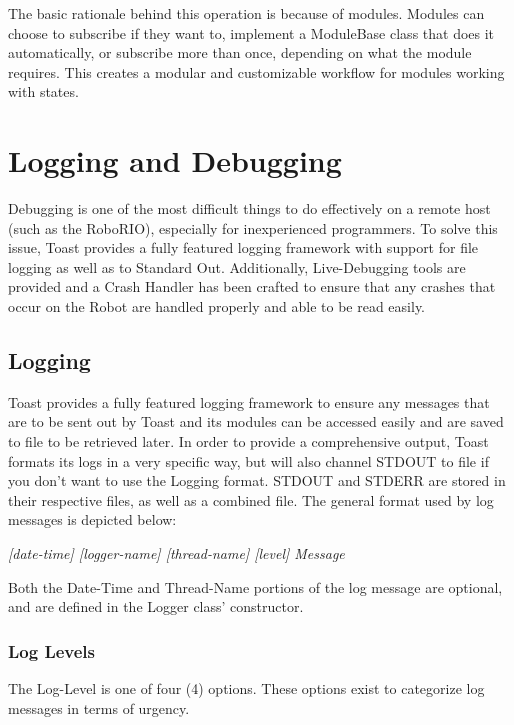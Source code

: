 \documentclass[a4paper,12pt]{article}
\begin{document}
The basic rationale behind this operation is because of modules. Modules can choose to subscribe if they want to, implement a ModuleBase class that does it automatically, or subscribe more than once, depending on what the module requires. This creates a modular and customizable workflow for modules working with states.

\newpage

\section{Logging and Debugging}
Debugging is one of the most difficult things to do effectively on a remote host (such as the RoboRIO), especially for inexperienced programmers. To solve this issue, Toast provides a fully featured logging framework with support for file logging as well as to Standard Out. Additionally, Live-Debugging tools are provided and a Crash Handler has been crafted to ensure that any crashes that occur on the Robot are handled properly and able to be read easily.

\subsection{Logging}
Toast provides a fully featured logging framework to ensure any messages that are to be sent out by Toast and its modules can be accessed easily and are saved to file to be retrieved later. In order to provide a comprehensive output, Toast formats its logs in a very specific way, but will also channel STDOUT to file if you don't want to use the Logging format. STDOUT and STDERR are stored in their respective files, as well as a combined file. The general format used by log messages is depicted below:

\hspace{2cm} \textit{[date-time] [logger-name] [thread-name] [level] Message}

Both the Date-Time and Thread-Name portions of the log message are optional, and are defined in the Logger class' constructor.

\subsubsection{Log Levels}
The Log-Level is one of four (4) options. These options exist to categorize log messages in terms of urgency.
\end{document}
